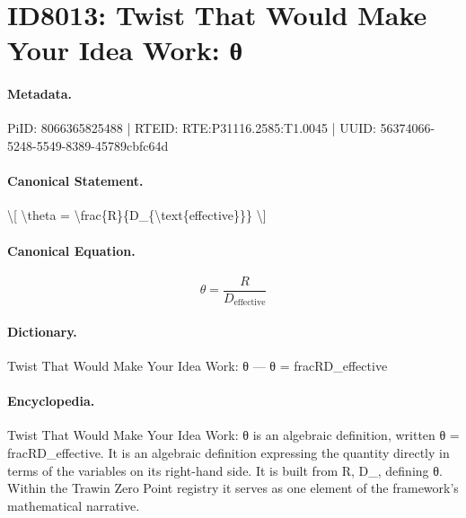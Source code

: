 \section*{ID8013: Twist That Would Make Your Idea Work: θ}
\paragraph{Metadata.}
PiID: 8066365825488 | RTEID: RTE:P31116.2585:T1.0045 | UUID: 56374066-5248-5549-8389-45789cbfc64d

\paragraph{Canonical Statement.}
\textbackslash{}[ \textbackslash{}theta = \textbackslash{}frac\{R\}\{D\_\{\textbackslash{}text\{effective\}\}\} \textbackslash{}]

\paragraph{Canonical Equation.}
\[
\theta = \frac{R}{D_{\text{effective}}}
\]

\paragraph{Dictionary.}
Twist That Would Make Your Idea Work: θ — θ = fracRD\_effective

\paragraph{Encyclopedia.}
Twist That Would Make Your Idea Work: θ is an algebraic definition, written θ = fracRD\_effective. It is an algebraic definition expressing the quantity directly in terms of the variables on its right-hand side. It is built from R, D\_, defining θ. Within the Trawin Zero Point registry it serves as one element of the framework's mathematical narrative.
